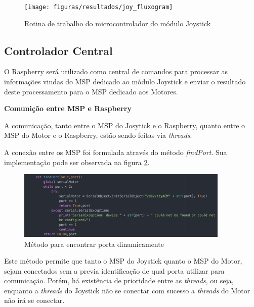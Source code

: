 \begin{figure}[!htb]
\centering
\texttt{[image: figuras/resultados/joy\_fluxogram]}
\caption{Rotina de trabalho do microcontrolador do módulo Joystick}
\label{fig:joy_fluxogram}
\end{figure}

\subsection{Controlador Central}

  O Raspberry será utilizado como central de comandos para processar as informações vindas do MSP dedicado ao módulo Joystick e enviar o resultado deste processamento para o MSP dedicado aos Motores.

  \textbf{Comunição entre MSP e Raspberry}

  A comunicação, tanto entre o MSP do Josytick e o Raspberry, quanto entre o MSP do Motor e o Raspberry, estão sendo feitas via \textit{threads}.

  A conexão entre os MSP foi formulada através do método \textit{findPort}. Sua implementação pode ser observada na figura \ref{fig:find_port_method}.

  \begin{figure}[!htb]
    \centering
    \includegraphics[width=0.9\textwidth]{figuras/resultados/find_port_method}
    \caption{Método para encontrar porta dinamicamente}
    \label{fig:find_port_method}
  \end{figure}

  Este método permite que tanto o MSP do Joystick quanto o MSP do Motor, sejam conectados sem a previa identificação de qual porta utilizar para comunicação. Porém, há existência de prioridade entre as \textit{threads}, ou seja, enquanto a \textit{threads} do Joystick não se conectar com sucesso a \textit{threads} do Motor não irá se conectar.

